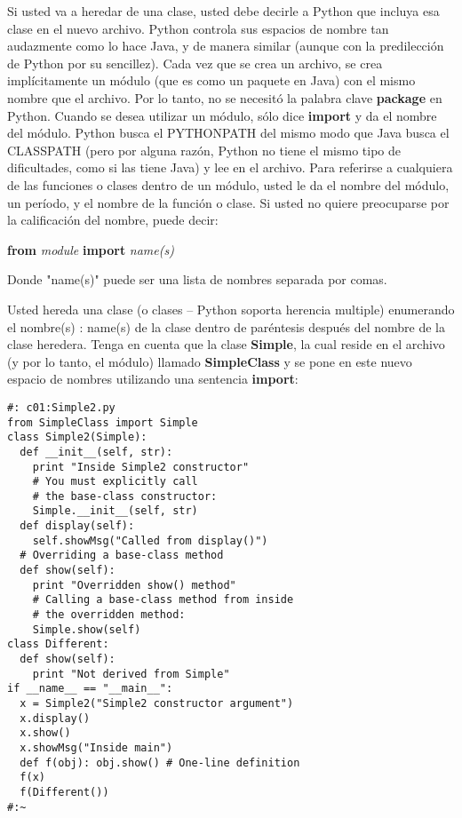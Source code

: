 Si usted va a heredar de una clase, usted debe decirle a Python que incluya esa clase en el nuevo archivo. Python controla sus espacios de nombre tan audazmente como lo hace Java, y de manera similar (aunque con la predilección de Python por su sencillez). Cada vez que se crea un archivo, se crea implícitamente un módulo (que es como un paquete en Java) con el mismo nombre que el archivo. Por lo tanto, no se necesitó la palabra clave \textbf{package} en Python. Cuando se desea utilizar un módulo, sólo dice \textbf{import} y da el nombre del módulo. Python busca el PYTHONPATH del mismo modo que Java busca el CLASSPATH (pero por alguna razón, Python no tiene el mismo tipo de dificultades, como si las tiene Java) y lee en el archivo. Para referirse a cualquiera de las funciones o clases dentro de un módulo, usted le da el nombre del módulo, un período, y el nombre de la función o clase. Si usted no quiere preocuparse por la calificación del nombre, puede decir: \newline

\textbf{from} \textit{module} \textbf{import} \textit{name(s)} \newline

Donde "name(s)" puede ser una lista de nombres separada por comas. \newline

Usted hereda una clase (o clases – Python soporta herencia multiple) enumerando el nombre(s) : name(s)  de la clase dentro de paréntesis después del nombre de la clase heredera. Tenga en cuenta que la clase \textbf{Simple}, la cual reside en el archivo (y por lo tanto, el módulo) llamado \textbf{SimpleClass} y se pone en este nuevo espacio de nombres utilizando una sentencia \textbf{import}:  \newline

\begin{lstlisting} 
#: c01:Simple2.py 
from SimpleClass import Simple 
class Simple2(Simple): 
  def __init__(self, str): 
    print "Inside Simple2 constructor" 
    # You must explicitly call  
    # the base-class constructor: 
    Simple.__init__(self, str) 
  def display(self): 
    self.showMsg("Called from display()") 
  # Overriding a base-class method 
  def show(self): 
    print "Overridden show() method" 
    # Calling a base-class method from inside 
    # the overridden method: 
    Simple.show(self) 
class Different: 
  def show(self): 
    print "Not derived from Simple" 
if __name__ == "__main__": 
  x = Simple2("Simple2 constructor argument") 
  x.display() 
  x.show() 
  x.showMsg("Inside main") 
  def f(obj): obj.show() # One-line definition 
  f(x) 
  f(Different()) 
#:~ 
\end{lstlisting}

